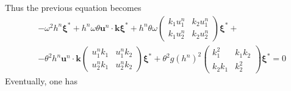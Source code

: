 \documentclass[a4paper, 11pt]{report}
\begin{document}
Thus the previous equation becomes
\begin{equation*}
\begin{split}
&-\omega^2h^n\boldsymbol{\xi}^*+h^n\omega \theta\boldsymbol{u}^n\cdot \boldsymbol{k}\boldsymbol{\xi}^*+h^n\theta\omega \begin{pmatrix}k_1u_1^n&k_2u_1^n\\k_1u_2^n&k_2u_2^n\end{pmatrix}\boldsymbol{\xi}^*+\\
&-\theta^2 h^n\boldsymbol{u}^n\cdot \boldsymbol{k}\begin{pmatrix}u_1^nk_1&u_1^nk_2\\u_2^nk_1&u_2^nk_2\end{pmatrix}
\boldsymbol{\xi}^*+\theta^2g(h^n)^2\begin{pmatrix}k_1^2&k_1k_2\\k_2k_1&k_2^2\end{pmatrix}\boldsymbol{\xi}^*=0
\end{split}
\end{equation*}
Eventually, one has
\end{document}
